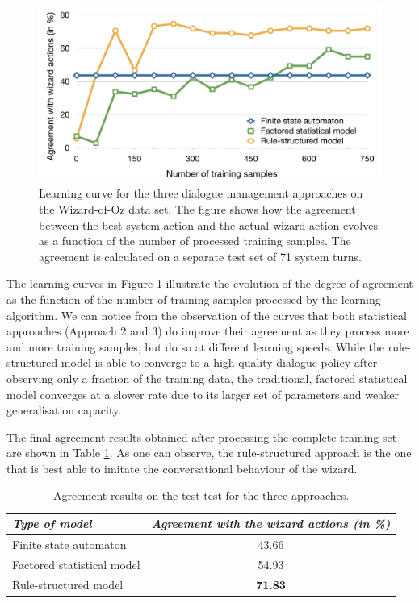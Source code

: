 \begin{figure}[h]
\vspace{3mm}\centering\includegraphics[scale=0.35]{imgs/curve-exp3.pdf}
\caption{Learning curve for the three dialogue management approaches on the Wizard-of-Oz data set.  The figure shows how the agreement between the best system action and the actual wizard action evolves as a function of the number of processed training samples.  The agreement is calculated on a separate test set of 71 system turns.}
\label{fig:curve-exp3}
\end{figure}


The learning curves in Figure \ref{fig:curve-exp3} illustrate the evolution of the degree of agreement as the function of the number of training samples processed by the learning algorithm.  We can notice from the observation of the curves that both statistical approaches (Approach 2 and 3) do improve their agreement as they process more and more training samples, but do so at different learning speeds.  While the rule-structured model is able to converge to a high-quality dialogue policy after observing only a fraction of the training data, the traditional, factored statistical model converges at a slower rate due to its larger set of parameters and weaker generalisation capacity. 

The final agreement results obtained after processing the complete training set are shown in Table \ref{table:learning-exp3}.  As one can observe, the rule-structured approach is the one that is best able to imitate the conversational behaviour of the wizard. 

\begin{table}[h]
\begin{center}
\begin{tabular}{|l|c|} \hline
\textit{Type of model} & \textit{Agreement with the wizard actions (in \%) } \\ \hline \hline
Finite state automaton & 43.66 \\ \hline
Factored statistical model & 54.93 \\ \hline
Rule-structured model & \textbf{71.83} \\ \hline
\end{tabular}
\end{center}
\vspace{-2mm}
\caption{Agreement results on the test test for the three approaches.}
\vspace{-2mm}
\label{table:learning-exp3}
\end{table}

